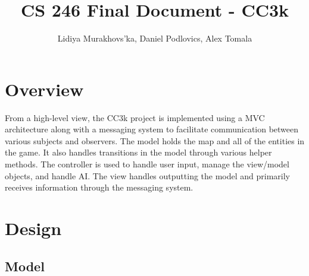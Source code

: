 \documentclass[12pt]{article}
\title{CS 246 Final Document - CC3k}
\author{
Lidiya Murakhovs'ka, Daniel Podlovics, Alex Tomala
}
\date {}
\begin{document}
\maketitle

\section*{Overview}
From a high-level view, the CC3k project is implemented using a MVC architecture along with a messaging system to facilitate communication between various subjects and observers. The model holds the map and all of the entities in the game. It also handles transitions in the model through various helper methods. The controller is used to handle user input, manage the view/model objects, and handle AI. The view handles outputting the model and primarily receives information through the messaging system. 

\section*{Design}

\subsection*{Model}
\end{document}
